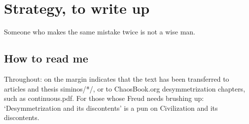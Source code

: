 
\chapter{Strategy, to write up}

\begin{bartlett}{
Someone who makes the same mistake twice is not a wise man.
}
\end{bartlett}




\section{How to read me}

Throughout:  {\textdollar} on the margin
{\steady}
indicates that the text has been transferred to
articles and thesis siminos/*/,  or to ChaosBook.org desymmetrization
chapters, such as
{continuous.pdf}.
%
For those whose Freud needs brushing up:
`Desymmetrization and its discontents' is a pun
on 
{Civilization and its discontents}.

